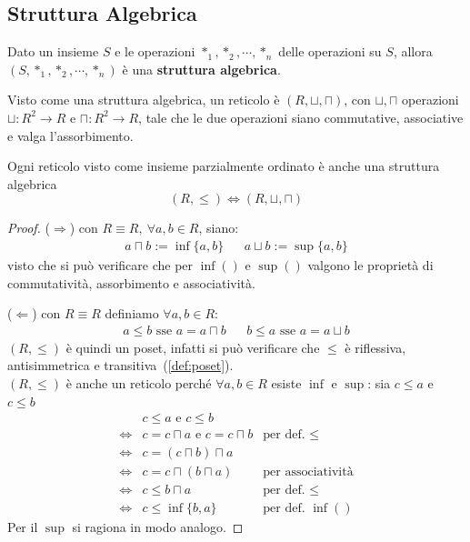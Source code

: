 \subsection{Struttura Algebrica}
\begin{defi}
Dato un insieme $S$ e le operazioni $*_1, *_2, \cdots, *_n$ delle operazioni su $S$, allora $(S, *_1, *_2, \cdots, *_n)$ è una \textbf{struttura algebrica}.
\end{defi} 
\begin{defi}
  Visto come una struttura algebrica, un reticolo è $(R, \sqcup, \sqcap)$, con $\sqcup, \sqcap$ operazioni $\sqcup: R^2 \rightarrow R$ e $ \sqcap: R^2 \rightarrow R$, tale che le due operazioni siano commutative, associative e valga l'assorbimento.
\end{defi}
\begin{lem}
Ogni reticolo visto come insieme parzialmente ordinato è anche una struttura algebrica
$$
(R, \leq) \iff (R, \sqcup, \sqcap)
$$
\end{lem}
\begin{proof}
  ($\Longrightarrow$) con $R\equiv R,\ \forall a,b \in R$, siano:
  \begin{align*}
     a \sqcap b := \inf \{a,b\} && a \sqcup b := \sup \{a,b\}
  \end{align*}
  visto che si può verificare che per $\inf()$ e $\sup()$ valgono le proprietà di commutatività, assorbimento e associatività.
  
  ($\Longleftarrow$) con $R \equiv R$ definiamo $\forall a,b \in R$:
  \begin{align*}
    a \leq b \text{ sse } a = a \sqcap b &&
    b \leq a \text{ sse } a = a \sqcup b
  \end{align*}
  $(R, \leq)$ è quindi un poset, infatti si può verificare che $\leq$ è riflessiva, antisimmetrica e transitiva~(\ref{def:poset}). \\
  $(R, \leq)$ è anche un reticolo perché $\forall a,b \in R$ esiste $\inf$ e $\sup$: sia $c \leq a$ e $ c \leq b$
  \begin{align*}
    & c \leq a \text{ e } c \leq b \\
    \iff & c = c \sqcap a \text{ e } c = c \sqcap b & \text{per def. } \leq \\
    \iff & c = (c \sqcap b) \sqcap a \\
    \iff & c = c \sqcap (b \sqcap a) & \text{per associatività} \\
    \iff & c \leq b \sqcap a & \text{per def. } \leq \\
    \iff & c \leq \inf\{b, a\} & \text{per def. } \inf()
  \end{align*}
  Per il $\sup$ si ragiona in modo analogo. 
\end{proof}


